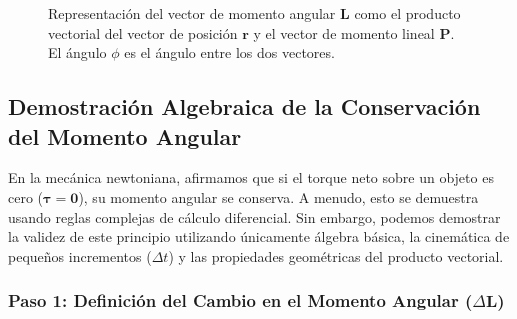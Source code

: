 \documentclass[11pt,a4paper]{book}
\begin{document}
\begin{figure}[h!]
    \caption{Representación del vector de momento angular $\boldsymbol{L}$ como el producto vectorial del vector de posición $\boldsymbol{r}$ y el vector de momento lineal $\boldsymbol{P}$. El ángulo $\phi$ es el ángulo entre los dos vectores.}
    \label{fig:momento_angular_3d_corregido}
\end{figure}


\subsection{Demostración Algebraica de la Conservación del Momento Angular}

En la mecánica newtoniana, afirmamos que si el torque neto sobre un objeto es cero ($\boldsymbol{\tau} = \boldsymbol{0}$), su momento angular se conserva. A menudo, esto se demuestra usando reglas complejas de cálculo diferencial. Sin embargo, podemos demostrar la validez de este principio utilizando únicamente álgebra básica, la cinemática de pequeños incrementos ($\Delta t$) y las propiedades geométricas del producto vectorial.

\subsubsection{Paso 1: Definición del Cambio en el Momento Angular ($\Delta \boldsymbol{L}$)}
\end{document}
